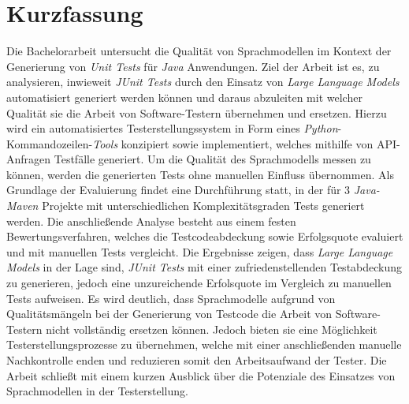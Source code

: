 

\clearpage
\chapter*{Kurzfassung}
Die Bachelorarbeit untersucht die Qualität von Sprachmodellen im Kontext der Generierung von \textit{Unit Tests} für \textit{Java} Anwendungen. Ziel der Arbeit ist es, zu analysieren, inwieweit \textit{JUnit Tests} durch den Einsatz von \textit{Large Language Models} automatisiert generiert werden können und daraus abzuleiten mit welcher Qualität sie die Arbeit von Software-Testern übernehmen und ersetzen. Hierzu wird ein automatisiertes Testerstellungssystem in Form eines \textit{Python}-Kommandozeilen-\textit{Tools} konzipiert sowie implementiert, welches mithilfe von API-Anfragen Testfälle generiert. Um die Qualität des Sprachmodells messen zu können, werden die generierten Tests ohne manuellen Einfluss übernommen. Als Grundlage der Evaluierung findet eine Durchführung statt, in der für 3 \textit{Java-Maven} Projekte mit unterschiedlichen Komplexitätsgraden Tests generiert werden. Die anschließende Analyse besteht aus einem festen Bewertungsverfahren, welches die Testcodeabdeckung sowie Erfolgsquote evaluiert und mit manuellen Tests vergleicht. Die Ergebnisse zeigen, dass \textit{Large Language Models} in der Lage sind, \textit{JUnit Tests} mit einer zufriedenstellenden Testabdeckung zu generieren, jedoch eine unzureichende Erfolsquote im Vergleich zu manuellen Tests aufweisen. Es wird deutlich, dass Sprachmodelle aufgrund von Qualitätsmängeln bei der Generierung von Testcode die Arbeit von Software-Testern nicht vollständig ersetzen können. Jedoch bieten sie eine Möglichkeit Testerstellungsprozesse zu übernehmen, welche mit einer anschließenden manuelle Nachkontrolle enden und reduzieren somit den Arbeitsaufwand der Tester. Die Arbeit schließt mit einem kurzen Ausblick über die Potenziale des Einsatzes von Sprachmodellen in der Testerstellung.\\\\
